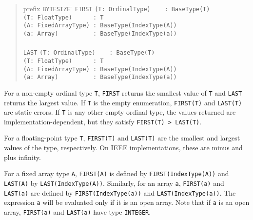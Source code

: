 \documentclass[10pt]{article}
\begin{document}
\begin{quote}
  \begin{tabbing}
    prefix \= \verb|BYTESIZE| \= \kill
    \> \verb|FIRST| \> \verb|(T: OrdinalType)    : BaseType(T)| \\
    \>              \> \verb|(T: FloatType)      : T| \\
    \>              \> \verb|(A: FixedArrayType) : BaseType(IndexType(A))| \\
    \>              \> \verb|(a: Array)          : BaseType(IndexType(a))| \\
    \\
    \> \verb|LAST|  \> \verb|(T: OrdinalType)    : BaseType(T)| \\
    \>              \> \verb|(T: FloatType)      : T| \\
    \>              \> \verb|(A: FixedArrayType) : BaseType(IndexType(A))| \\
    \>              \> \verb|(a: Array)          : BaseType(IndexType(a))|
  \end{tabbing}
\end{quote}
For a non-empty ordinal type \verb|T|, \verb|FIRST| returns the smallest value
of \verb|T| and \verb|LAST| returns the largest value.  If \verb|T| is the
empty enumeration, \verb|FIRST(T)| and \verb|LAST(T)| are static errors.  If
\verb|T| is any other empty ordinal type, the values returned are
implementation-dependent, but they satisfy \verb|FIRST(T) > LAST(T)|.

For a floating-point type \verb|T|, \verb|FIRST(T)| and \verb|LAST(T)| are the
smallest and largest values of the type, respectively.  On IEEE
implementations, these are minus and plus infinity.

For a fixed array type \verb|A|, \verb|FIRST(A)| is defined by
\verb|FIRST(IndexType(A))| and \verb|LAST(A)| by \verb|LAST(IndexType(A))|.
Similarly, for an array \verb|a|, \verb|FIRST(a)| and \verb|LAST(a)| are
defined by \verb|FIRST(IndexType(a))| and \verb|LAST(IndexType(a))|.  The
expression \verb|a| will be evaluated only if it is an open array.  Note that
if \verb|a| is an open array, \verb|FIRST(a)| and \verb|LAST(a)| have type
\verb|INTEGER|.
\end{document}
